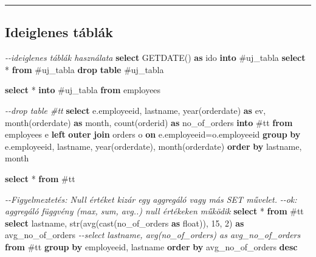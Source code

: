\documentclass[
  magyar,
]{article}
\newenvironment{Shaded}{}{}
\newcommand{\CommentTok}[1]{\textcolor[rgb]{0.38,0.63,0.69}{\textit{#1}}}
\newcommand{\DataTypeTok}[1]{\textcolor[rgb]{0.56,0.13,0.00}{#1}}
\newcommand{\DecValTok}[1]{\textcolor[rgb]{0.25,0.63,0.44}{#1}}
\newcommand{\FunctionTok}[1]{\textcolor[rgb]{0.02,0.16,0.49}{#1}}
\newcommand{\KeywordTok}[1]{\textcolor[rgb]{0.00,0.44,0.13}{\textbf{#1}}}
\newcommand{\NormalTok}[1]{#1}
\newcommand{\OperatorTok}[1]{\textcolor[rgb]{0.40,0.40,0.40}{#1}}
\begin{document}
\begin{center}\rule{0.5\linewidth}{0.5pt}\end{center}

\subsection{Ideiglenes táblák}\label{ideiglenes-tuxe1bluxe1k}

\begin{Shaded}
\begin{Highlighting}[]
\CommentTok{{-}{-}ideiglenes táblák használata}
\KeywordTok{select}\NormalTok{ GETDATE() }\KeywordTok{as}\NormalTok{ ido }\KeywordTok{into}\NormalTok{ \#uj\_tabla}
\KeywordTok{select} \OperatorTok{*} \KeywordTok{from}\NormalTok{ \#uj\_tabla}
\KeywordTok{drop} \KeywordTok{table}\NormalTok{ \#uj\_tabla}

\KeywordTok{select} \OperatorTok{*} \KeywordTok{into}\NormalTok{ \#uj\_tabla }\KeywordTok{from}\NormalTok{ employees}

\CommentTok{{-}{-}drop table \#tt}
\KeywordTok{select}\NormalTok{ e.employeeid, lastname, }\DataTypeTok{year}\NormalTok{(orderdate) }\KeywordTok{as}\NormalTok{ ev, }\DataTypeTok{month}\NormalTok{(orderdate) }\KeywordTok{as} \DataTypeTok{month}\NormalTok{,}
\FunctionTok{count}\NormalTok{(orderid) }\KeywordTok{as}\NormalTok{ no\_of\_orders}
\KeywordTok{into}\NormalTok{ \#tt}
\KeywordTok{from}\NormalTok{ employees e }\KeywordTok{left} \KeywordTok{outer} \KeywordTok{join}\NormalTok{ orders o }\KeywordTok{on}\NormalTok{ e.employeeid}\OperatorTok{=}\NormalTok{o.employeeid}
\KeywordTok{group} \KeywordTok{by}\NormalTok{ e.employeeid, lastname, }\DataTypeTok{year}\NormalTok{(orderdate), }\DataTypeTok{month}\NormalTok{(orderdate)}
\KeywordTok{order} \KeywordTok{by}\NormalTok{ lastname, }\DataTypeTok{month}

\KeywordTok{select} \OperatorTok{*} \KeywordTok{from}\NormalTok{ \#tt}

\CommentTok{{-}{-}Figyelmeztetés: Null értéket kizár egy aggregáló vagy más SET művelet.}
\CommentTok{{-}{-}ok: aggregáló függvény (max, sum, avg..) null értékeken működik}
\KeywordTok{select} \OperatorTok{*} \KeywordTok{from}\NormalTok{ \#tt}
\KeywordTok{select}\NormalTok{ lastname, str(}\FunctionTok{avg}\NormalTok{(}\FunctionTok{cast}\NormalTok{(no\_of\_orders }\KeywordTok{as} \DataTypeTok{float}\NormalTok{)), }\DecValTok{15}\NormalTok{, }\DecValTok{2}\NormalTok{) }\KeywordTok{as}\NormalTok{ avg\_no\_of\_orders}
\CommentTok{{-}{-}select lastname, avg(no\_of\_orders) as avg\_no\_of\_orders}
\KeywordTok{from}\NormalTok{ \#tt }\KeywordTok{group} \KeywordTok{by}\NormalTok{ employeeid, lastname}
\KeywordTok{order} \KeywordTok{by}\NormalTok{ avg\_no\_of\_orders }\KeywordTok{desc}


\end{Highlighting}
\end{Shaded}
\end{document}
